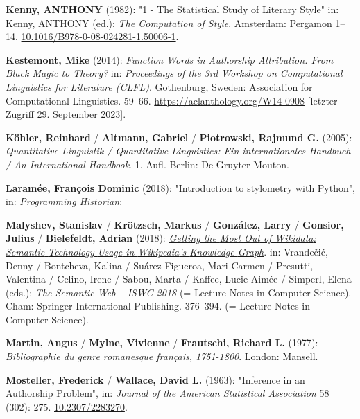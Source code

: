 \documentclass[
  12pt,
  letterpaper,
  DIV=11,
  numbers=noendperiod]{scrreprt}
\newlength{\cslhangindent}
\newenvironment{CSLReferences}[2] %
 {\begin{list}{}{%
  \setlength{\itemindent}{0pt}
  \setlength{\leftmargin}{0pt}
  \setlength{\parsep}{0pt}
  \ifodd #1
   \setlength{\leftmargin}{\cslhangindent}
   \setlength{\itemindent}{-1\cslhangindent}
  \fi
  \setlength{\itemsep}{#2\baselineskip}}}
 {\end{list}}
\begin{document}
\begin{CSLReferences}{1}{0}
\textbf{Kenny, ANTHONY} (1982): "1 - {The} {Statistical} {Study} of
{Literary} {Style}" in: Kenny, ANTHONY (ed.): \emph{The {Computation} of
{Style}}. Amsterdam: Pergamon 1--14.
\href{https://doi.org/10.1016/B978-0-08-024281-1.50006-1}{10.1016/B978-0-08-024281-1.50006-1}.

\textbf{Kestemont, Mike} (2014): \emph{Function {Words} in {Authorship}
{Attribution}. {From} {Black} {Magic} to {Theory}?} in:
\emph{Proceedings of the 3rd {Workshop} on {Computational} {Linguistics}
for {Literature} ({CLFL})}. Gothenburg, Sweden: Association for
Computational Linguistics. 59--66.
\url{https://aclanthology.org/W14-0908} {[}letzter Zugriff 29. September
2023{]}.

\textbf{Köhler, Reinhard} / \textbf{Altmann, Gabriel} /
\textbf{Piotrowski, Rajmund G.} (2005): \emph{Quantitative {Linguistik}
/ {Quantitative} {Linguistics}: {Ein} internationales {Handbuch} / {An}
{International} {Handbook}}. 1. Aufl. Berlin: De Gruyter Mouton.

\textbf{Laramée, François Dominic} (2018):
"\href{https://programminghistorian.org/en/lessons/introduction-to-stylometry-with-python}{Introduction
to stylometry with {Python}}", in: \emph{Programming Historian}:

\textbf{Malyshev, Stanislav} / \textbf{Krötzsch, Markus} /
\textbf{González, Larry} / \textbf{Gonsior, Julius} /
\textbf{Bielefeldt, Adrian} (2018):
\emph{\href{https://doi.org/10.1007/978-3-030-00668-6_23}{Getting the
{Most} {Out} of {Wikidata}: {Semantic} {Technology} {Usage} in
{Wikipedia}'s {Knowledge} {Graph}}}. in: Vrandečić, Denny / Bontcheva,
Kalina / Suárez-Figueroa, Mari Carmen / Presutti, Valentina / Celino,
Irene / Sabou, Marta / Kaffee, Lucie-Aimée / Simperl, Elena (eds.):
\emph{The {Semantic} {Web} -- {ISWC} 2018} (= Lecture {Notes} in
{Computer} {Science}). Cham: Springer International Publishing.
376--394. (= Lecture {Notes} in {Computer} {Science}).

\textbf{Martin, Angus} / \textbf{Mylne, Vivienne} / \textbf{Frautschi,
Richard L.} (1977): \emph{Bibliographie du genre romanesque français,
1751-1800}. London: Mansell.

\textbf{Mosteller, Frederick} / \textbf{Wallace, David L.} (1963):
"Inference in an {Authorship} {Problem}", in: \emph{Journal of the
American Statistical Association} 58 (302): 275.
\href{https://doi.org/10.2307/2283270}{10.2307/2283270}.


\end{CSLReferences}
\end{document}
